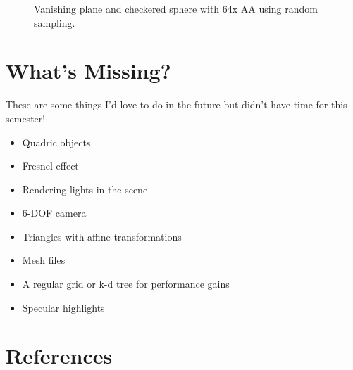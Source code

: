 \documentclass{article}
\begin{document}
\begin{figure}[H]
    \centering
    \caption{Vanishing plane and checkered sphere with 64x AA using random sampling.}
\end{figure}

\section{What's Missing?}

These are some things I'd love to do in the future but didn't have time for this semester!

\begin{itemize}
    \item Quadric objects
    \item Fresnel effect
    \item Rendering lights in the scene
    \item 6-DOF camera
    \item Triangles with affine transformations
    \item Mesh files
    \item A regular grid or k-d tree for performance gains
    \item Specular highlights
\end{itemize}

\section{References}
\end{document}
